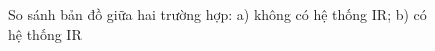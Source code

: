 \begin{figure}[htbp]
    \centering
    \hspace{8pt}
    \caption{So sánh bản đồ giữa hai trường hợp: a) không có hệ thống IR; b) có hệ thống IR}
    \label{fig:rb_with_obstacle_in_rviz}
\end{figure}


